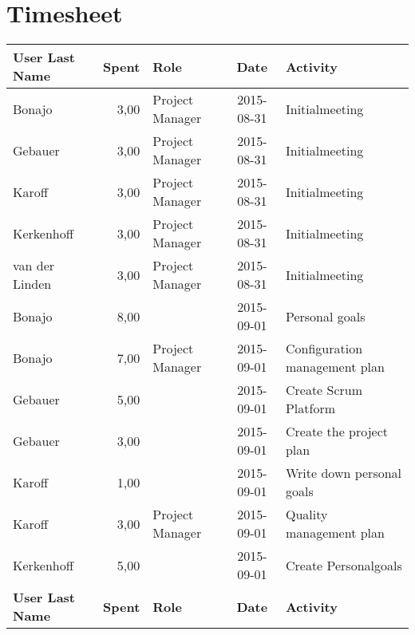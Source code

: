 \section{Timesheet}
	\renewcommand{\arraystretch}{2}
	\begin{longtable}{ l r p{2cm} c p{4cm}}
		\textbf{User Last Name} & \textbf{Spent} & \textbf{Role} & \textbf{Date} & \textbf{Activity} \\
		\hline
		Bonajo                  & 3,00           & Project Manager & 2015-08-31    & Initialmeeting                                  \\
		Gebauer                 & 3,00           & Project Manager & 2015-08-31    & Initialmeeting                                  \\
		Karoff                  & 3,00           & Project Manager & 2015-08-31    & Initialmeeting                                  \\
		Kerkenhoff              & 3,00           & Project Manager & 2015-08-31    & Initialmeeting                                  \\
		van der Linden          & 3,00           & Project Manager & 2015-08-31    & Initialmeeting                                  \\
		Bonajo                  & 8,00           &                 & 2015-09-01    & Personal goals                                  \\
		Bonajo                  & 7,00           & Project Manager & 2015-09-01    & Configuration management plan                   \\
		Gebauer                 & 5,00           &                 & 2015-09-01    & Create Scrum Platform                           \\
		Gebauer                 & 3,00           &                 & 2015-09-01    & Create the project plan                         \\
		Karoff                  & 1,00           &                 & 2015-09-01    & Write down personal goals                       \\
		Karoff                  & 3,00           & Project Manager & 2015-09-01    & Quality management plan                         \\
		Kerkenhoff              & 5,00           &                 & 2015-09-01    & Create Personalgoals                            \\
		\textbf{User Last Name} & \textbf{Spent} & \textbf{Role} & \textbf{Date} & \textbf{Activity} \\

\end{longtable}
